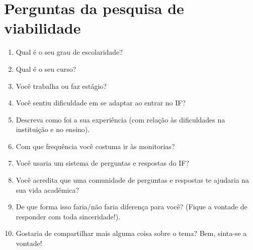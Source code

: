 \chapter{Perguntas da pesquisa de viabilidade}
\label{questões}

\begin{enumerate}
  \item Qual é o seu grau de escolaridade?
  \item Qual é o seu curso?
  \item Você trabalha ou faz estágio?
  \item Você sentiu dificuldade em se adaptar ao entrar no IF?
  \item Descreva como foi a sua experiência (com relação às dificuldades na instituição e no ensino).
  \item Com que frequência você costuma ir às monitorias?
  \item Você usaria um sistema de perguntas e respostas do IF?
  \item Você acredita que uma comunidade de perguntas e respostas te ajudaria na sua vida acadêmica?
  \item De que forma isso faria/não faria diferença para você? (Fique a vontade de responder com toda sinceridade!).
  \item Gostaria de compartilhar mais alguma coisa sobre o tema? Bem, sinta-se a vontade!
\end{enumerate}